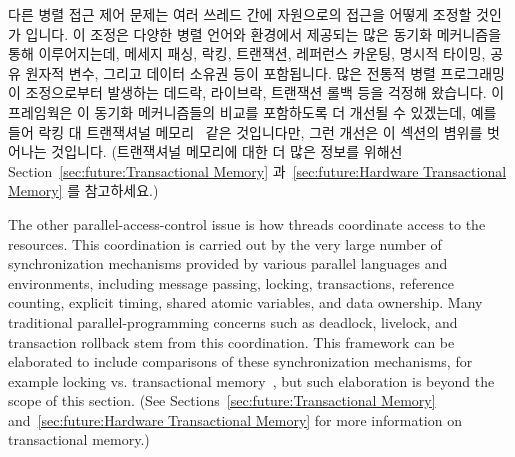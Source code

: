 다른 병렬 접근 제어 문제는 여러 쓰레드 간에 자원으로의 접근을 어떻게 조정할
것인가 입니다.
이 조정은 다양한 병렬 언어와 환경에서 제공되는 많은 동기화 메커니즘을 통해
이루어지는데, 메세지 패싱, 락킹, 트랜잭션, 레퍼런스 카운팅, 명시적 타이밍, 공유
원자적 변수, 그리고 데이터 소유권 등이 포함됩니다.
많은 전통적 병렬 프로그래밍 이 조정으로부터 발생하는 데드락, 라이브락, 트랜잭션
롤백 등을 걱정해 왔습니다.
이 프레임웍은 이 동기화 메커니즘들의 비교를 포함하도록 더 개선될 수 있겠는데, 예를 들어 락킹 대 트랜잭셔널 메모리~\cite{McKenney2007PLOSTM} 같은 것입니다만, 그런 개선은 이 섹션의 볌위를 벗어나는 것입니다.
(트랜잭셔널 메모리에 대한 더 많은 정보를 위해선
Section~\ref{sec:future:Transactional Memory}
과~\ref{sec:future:Hardware Transactional Memory} 를 참고하세요.)

\iffalse

The other parallel-access-control issue is how threads coordinate
access to the resources.
This coordination is carried out by
the very large number of synchronization mechanisms
provided by various parallel languages and environments,
including message passing, locking, transactions,
reference counting, explicit timing, shared atomic variables, and data
ownership.
Many traditional parallel-programming concerns such as deadlock,
livelock, and transaction rollback stem from this coordination.
This framework can be elaborated to include comparisons
of these synchronization mechanisms, for example locking vs. transactional
memory~\cite{McKenney2007PLOSTM}, but such elaboration is beyond the
scope of this section.
(See
Sections~\ref{sec:future:Transactional Memory}
and~\ref{sec:future:Hardware Transactional Memory}
for more information on transactional memory.)

